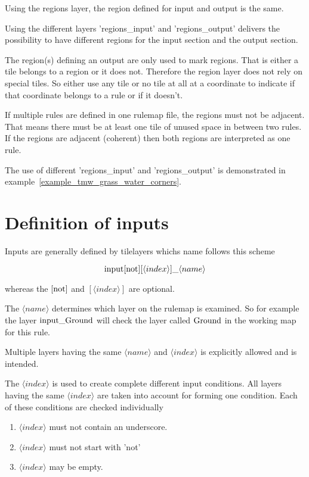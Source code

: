 \documentclass[dvips, a4paper, 12pt,listof=totoc, oneside, parskip]{scrbook}
\begin{document}
Using the regions layer, the region defined for input and output is
the same.

Using the different layers 'regions\_input' and 'regions\_output'
delivers the possibility to have different regions for the input section
and the output section.

The region(s) defining an output are only used to mark regions.
That is either a tile belongs to a region or it does not. Therefore the
region layer does not rely on special tiles. So either use any tile or
no tile at all at a coordinate to indicate if that coordinate belongs to a
rule or if it doesn't.

If multiple rules are defined in one rulemap file, the regions must not be
adjacent. That means there must be at least one tile of unused space in between
two rules. If the regions are adjacent (coherent) then both regions are interpreted as
one rule.

The use of different 'regions\_input' and 'regions\_output' is demonstrated
in example~\ref{example_tmw_grass_water_corners}.

\section{Definition of inputs}
Inputs are generally defined by tilelayers whichs name follows this scheme

$$\textup{input}[\textup{not}] [\langle index \rangle]  \_ \langle name \rangle$$

whereas the $[\textup{not}]$ and $[\langle index \rangle]$ are optional.

The $\langle name \rangle$ determines which layer on the rulemap is examined.
So for example the layer $\textup{input}\_\textup{Ground}$ will check the
layer called $\textup{Ground}$ in the working map for this rule.

Multiple layers having the same $\langle name \rangle$ and $\langle index \rangle$ 
is explicitly allowed and is intended.

The $\langle index \rangle$ is used to create complete different input conditions.
All layers having the same $\langle index \rangle$ are taken into account for forming one
condition. Each of these conditions are checked individually

\begin{enumerate}
  \item $\langle index \rangle$ must not contain an underscore.
  \item $\langle index \rangle$ must not start with 'not'
  \item $\langle index \rangle$ may be empty.
\end{enumerate}
\end{document}
